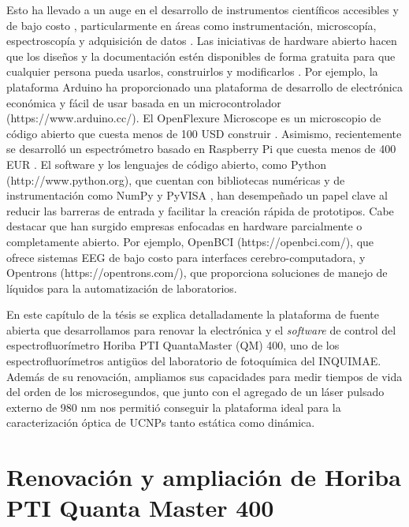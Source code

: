 Esto ha llevado a un auge en el desarrollo de instrumentos científicos accesibles y de bajo costo \cite{wenzel_open_2023, arancio_inequalities_2023}, particularmente en áreas como instrumentación, microscopía, espectroscopía y adquisición de datos \cite{jameson_fluorescent_1989, li_optical_2022, hu_fluorescent_2022}.
Las iniciativas de hardware abierto hacen que los diseños y la documentación estén disponibles de forma gratuita para que cualquier persona pueda usarlos, construirlos y modificarlos \cite{powell_democratizing_2012, oellermann_open_2022}.
Por ejemplo, la plataforma Arduino ha proporcionado una plataforma de desarrollo de electrónica económica y fácil de usar basada en un microcontrolador (https://www.arduino.cc/).
El OpenFlexure Microscope es un microscopio de código abierto que cuesta menos de 100 USD construir \cite{collins_robotic_2020}.
Asimismo, recientemente se desarrolló un espectrómetro basado en Raspberry Pi que cuesta menos de 400 EUR \cite{tunens_optical_2024}.
El software y los lenguajes de código abierto, como Python (http://www.python.org), que cuentan con bibliotecas numéricas y de instrumentación como NumPy \cite{harris_array_2020} y PyVISA \cite{grecco_pyvisa_2023}, han desempeñado un papel clave al reducir las barreras de entrada y facilitar la creación rápida de prototipos.
Cabe destacar que han surgido empresas enfocadas en hardware parcialmente o completamente abierto. Por ejemplo, OpenBCI (https://openbci.com/), que ofrece sistemas EEG de bajo costo para interfaces cerebro-computadora, y Opentrons (https://opentrons.com/), que proporciona soluciones de manejo de líquidos para la automatización de laboratorios.

En este capítulo de la tésis se explica detalladamente la plataforma de fuente abierta que desarrollamos para renovar la electrónica y el \textit{software} de control del espectrofluorímetro Horiba PTI QuantaMaster (QM) 400, uno de los espectrofluorímetros antigüos del laboratorio de fotoquímica del INQUIMAE.
Además de su renovación, ampliamos sus capacidades para medir tiempos de vida del orden de los microsegundos, que junto con el agregado de un láser pulsado externo de 980 nm nos permitió conseguir la plataforma ideal para la caracterización óptica de UCNPs tanto estática como dinámica.

\section{Renovación y ampliación de Horiba PTI Quanta Master 400 }

